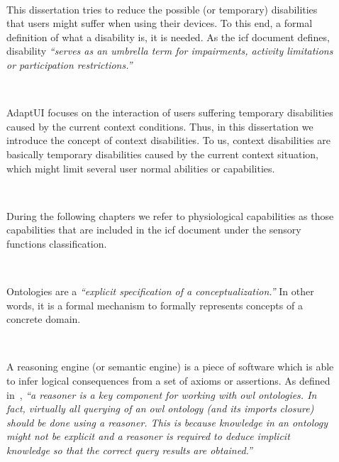 \begin{description}
  \item[] \hfill \\
  \begin{mdframed}[hidealllines=true,backgroundcolor=gray!20]
  This dissertation tries to reduce the possible (or temporary) disabilities 
  that users might suffer when using their devices. To this end, a formal 
  definition of what a disability is, it is needed. As the \ac{icf} document defines, 
  disability \textit{``serves as an umbrella term for impairments, activity 
  limitations or participation restrictions.''}
  \end{mdframed}

  \item[] \hfill \\
  \begin{mdframed}[hidealllines=true,backgroundcolor=gray!20]
  AdaptUI focuses on the interaction of users suffering temporary disabilities 
  caused by the current context conditions. Thus, in this dissertation we 
  introduce the concept of context disabilities. To us, context disabilities 
  are basically temporary disabilities caused by the current context situation, 
  which might limit several user normal abilities or capabilities.
  \end{mdframed}

  \item[] \hfill \\
  \begin{mdframed}[hidealllines=true,backgroundcolor=gray!20]
  During the following chapters we refer to physiological capabilities as those 
  capabilities that are included in the \ac{icf} document under the sensory 
  functions classification.
  \end{mdframed}
 
  \item[] \hfill \\
  \begin{mdframed}[hidealllines=true,backgroundcolor=gray!20]
  Ontologies are a \textit{``explicit specification of a conceptualization.''} 
  In other words, it is a formal mechanism to formally represents concepts of a 
  concrete domain.
  \end{mdframed}
  
  \item[] \hfill \\
  \begin{mdframed}[hidealllines=true,backgroundcolor=gray!20]
  A reasoning engine (or semantic engine) is a piece of software which is able 
  to infer logical consequences from a set of axioms or assertions. As defined
  in~\citep{owlapi_reasoners}, \textit{``a reasoner is a key component for working 
  with \ac{owl} ontologies. In fact, virtually all querying of an \ac{owl} ontology 
  (and its imports closure) should be done using a reasoner. This is because 
  knowledge in an ontology might not be explicit and a reasoner is required to 
  deduce implicit knowledge so that the correct query results are obtained.''}
  \end{mdframed}


\end{description}

